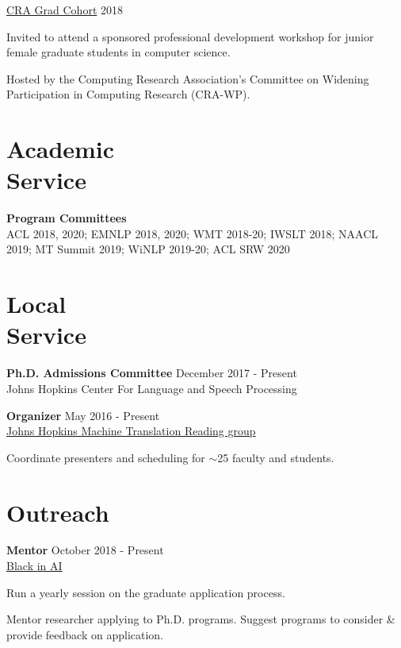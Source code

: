 \documentclass[margin,line,hyperref,color]{res}
\newenvironment{packed_itemize}{
\begin{itemize}[leftmargin=1.5em]
  \setlength{\itemsep}{0pt}
  \setlength{\parskip}{0pt}
  \setlength{\parsep}{0pt}
}{\end{itemize}}
\begin{document}
\begin{resume}
 \href{https://cra.org/cra-wp/grad-cohxort-for-women/}{CRA Grad Cohort} \hfill 2018
 \begin{packed_itemize}
\item Invited to attend a sponsored professional  development workshop for junior female graduate students in computer science.
\item Hosted by the Computing Research Association’s Committee on Widening Participation in Computing Research (CRA-WP).
 \end{packed_itemize}

\section{\sc Academic \\Service}

\textbf{Program Committees}\\
ACL 2018, 2020; EMNLP 2018, 2020; WMT 2018-20; IWSLT 2018; NAACL 2019; MT Summit 2019; WiNLP 2019-20; ACL SRW 2020\\

\section{\sc Local\\ Service}

\textbf{Ph.D. Admissions Committee} \hfill  December 2017 - Present \\ 
Johns Hopkins Center For Language and Speech Processing 

\textbf{Organizer}  \hfill   May 2016 - Present\\
\href{http://www.statmt.org/jhu/}{Johns Hopkins Machine Translation Reading group}
\begin{packed_itemize}
\item Coordinate presenters and scheduling for $\sim$25 faculty and students.
\end{packed_itemize}


\section{\sc Outreach}

\textbf{Mentor}  \hfill   October 2018 - Present\\
\href{http://blackinai.org/}{Black in AI}
\begin{packed_itemize}
\item Run a yearly session on the graduate application process. 
\item Mentor researcher applying to Ph.D. programs. Suggest programs to consider \& provide feedback on application. 
\end{packed_itemize}



\end{resume}
\end{document}
